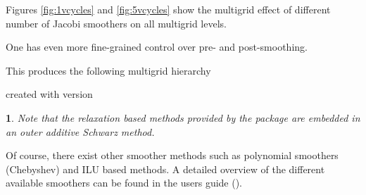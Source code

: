 \documentclass[10pt,fleqn]{book}
\newtheorem*{mycomment}{\ding{42}}
\newcommand\printScreenOutput[1]{

{\vspace{-0.3cm}\hfill\tiny{created with \muelu version }}
}
\begin{document}
Figures \ref{fig:1vcycles} and \ref{fig:5vcycles} show the multigrid effect of different number of Jacobi smoothers on all multigrid levels.

One has even more fine-grained control over pre- and post-smoothing.

This produces the following multigrid hierarchy
\printScreenOutput{s1_easy_jacobi2.txt_3.fragment_3.fragment}

\begin{mycomment}
Note that the relaxation based methods provided by the \ifpack package are embedded in an outer additive Schwarz method.
\end{mycomment}

Of course, there exist other smoother methods such as polynomial smoothers (Chebyshev) and ILU based methods.
A detailed overview of the different available smoothers can be found in the \muelu users guide (\cite{Mue}).
\end{document}
